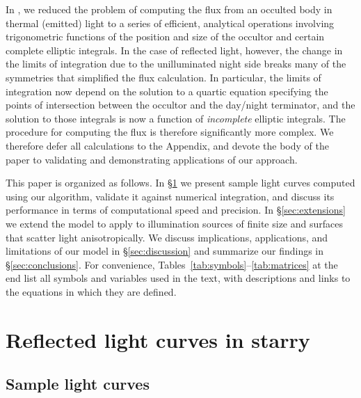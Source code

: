 \documentclass[modern]{aastex62}
\begin{document}
In \citet{Luger2019}, we reduced the problem of computing the flux from
an occulted body in thermal (emitted) light to a series of efficient, analytical
operations involving trigonometric functions of the position and size of the
occultor and certain complete elliptic integrals. In the case of reflected
light, however, the change in the limits of integration due to the
unilluminated night side breaks many of the symmetries that simplified
the flux calculation. In particular, the limits of integration now depend
on the solution to a quartic equation specifying the points of intersection
between the occultor and the day/night terminator, and the solution to
those integrals is now a function of \emph{incomplete} elliptic integrals.
The procedure for computing the flux is therefore significantly more complex.
%
We therefore defer all calculations to the Appendix, and devote the body of
the paper to validating and demonstrating applications of our approach.

This paper is organized as follows.
In \S\ref{sec:validation} we present sample light curves computed
using our algorithm, validate it against numerical integration, and
discuss its performance in terms of computational speed and precision.
In \S\ref{sec:extensions} we extend the model to apply to illumination
sources of finite size and surfaces that scatter light anisotropically.
We discuss implications, applications, and limitations of our model in
\S\ref{sec:discussion} and summarize our findings in \S\ref{sec:conclusions}.
For convenience, Tables~\ref{tab:symbols}--\ref{tab:matrices} at the end
list all symbols and variables used in the text, with descriptions and
links to the equations in which they are defined.

\section{Reflected light curves in starry}
\label{sec:validation}

\subsection{Sample light curves}
\label{sec:sample}
\end{document}
